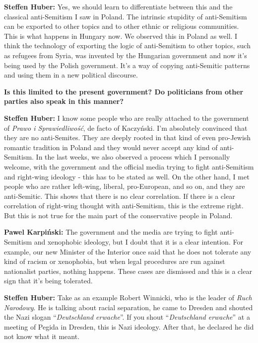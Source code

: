 \textbf{Steffen Huber:} Yes, we should learn to differentiate between this and the classical anti-Semitism I saw in Poland. The intrinsic stupidity of anti-Semitism can be exported to other topics and to other ethnic or religious communities. This is what happens in Hungary now. We observed this in Poland as well. I think the technology of exporting the logic of anti-Semitism to other topics, such as refugees from Syria, was invented by the Hungarian government and now it's being used by the Polish government. It’s a way of copying anti-Semitic patterns and using them in a new political discourse. 

\textbf{Is this limited to the present government? Do politicians from other parties also speak in this manner?} 

\textbf{Steffen Huber:} I know some people who are really attached to the government of \textit{Prawo i Sprawiedliwość}, de facto of Kaczyński. I'm absolutely convinced that they are no anti-Semites. They are deeply rooted in that kind of even pro-Jewish romantic tradition in Poland and they would never accept any kind of anti-Semitism. In the last weeks, we also observed a process which I personally welcome, with the government and the official media trying to fight anti-Semitism and right-wing ideology - this has to be stated as well. On the other hand, I met people who are rather left-wing, liberal, pro-European, and so on, and they are anti-Semitic. This shows that there is no clear correlation. If there is a clear correlation of right-wing thought with anti-Semitism, this is the extreme right. But this is not true for the main part of the conservative people in Poland. \par
\textbf{Pawel Karpiński:} The government and the media are trying to fight anti-Semitism and xenophobic ideology, but I doubt that it is a clear intention. For example, our new Minister of the Interior once said that he does not tolerate any kind of racism or xenophobia, but when legal procedures are run against nationalist parties, nothing happens. These cases are dismissed and this is a clear sign that it’s being tolerated.\par
\textbf{Steffen Huber:} Take as an example Robert Winnicki, who is the leader of \textit{Ruch Narodowy}. He is talking about racial separation, he came to Dresden and shouted the Nazi slogan ``\textit{Deutschland erwache}''. If you shout ``\textit{Deutschland erwache}'' at a meeting of Pegida in Dresden, this is Nazi ideology. After that, he declared he did not know what it meant.  

